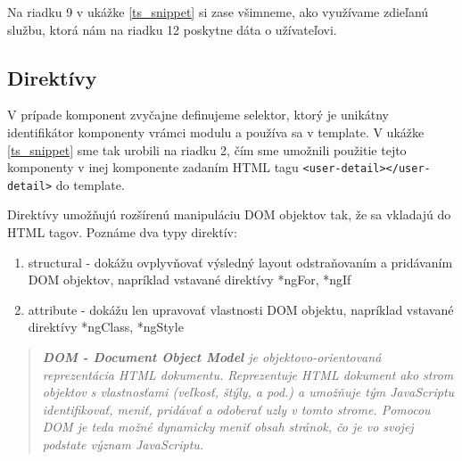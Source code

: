 \documentclass[
  digital, %
  twoside, %
  notable,   %
  nolof,   %
  nolot,   %
]{fithesis3}
\begin{document}
Na riadku 9 v ukážke \ref{ts_snippet} si zase všimneme, ako využívame zdieľanú službu, ktorá nám na riadku 12 poskytne dáta o užívateľovi.

\subsection{Direktívy}
V prípade komponent zvyčajne definujeme selektor, ktorý je unikátny identifikátor komponenty vrámci modulu a používa sa v template. V ukážke \ref{ts_snippet} sme tak urobili na riadku 2, čím sme umožnili použitie tejto komponenty v inej komponente zadaním HTML tagu \texttt{<user-detail></user-detail>} do template.

Direktívy umožňujú rozšírenú manipuláciu DOM objektov tak, že sa vkladajú do HTML tagov. Poznáme dva typy direktív\cite{angular}:
\begin{enumerate}
\item structural - dokážu ovplyvňovať výsledný layout odstraňovaním a pridávaním DOM objektov, napríklad vstavané direktívy *ngFor, *ngIf
\item attribute - dokážu len upravovať vlastnosti DOM objektu, napríklad vstavané direktívy *ngClass, *ngStyle
\end{enumerate}

\begin{quote}
\textit{\textbf{DOM - Document Object Model} je objektovo-orientovaná reprezentácia HTML dokumentu. Reprezentuje HTML dokument ako strom objektov s vlastnosťami (veľkosť, štýly, a pod.) a umožňuje tým JavaScriptu identifikovať, meniť, pridávať a odoberať uzly v tomto strome\cite{yang2009topic}. Pomocou DOM je teda možné dynamicky meniť obsah stránok, čo je vo svojej podstate význam JavaScriptu.}
\end{quote}
\end{document}
